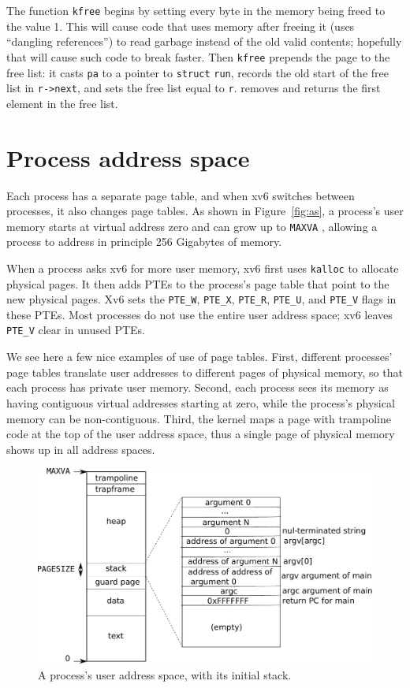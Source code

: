 The function
\lstinline{kfree}
begins by setting every byte in the
memory being freed to the value 1.
This will cause code that uses memory after freeing it
(uses ``dangling references'')
to read garbage instead of the old valid contents;
hopefully that will cause such code to break faster.
Then
\lstinline{kfree}
prepends the page to the free list:
it casts
\lstinline{pa}
to a pointer to
\lstinline{struct}
\lstinline{run},
records the old start of the free list in
\lstinline{r->next},
and sets the free list equal to
\lstinline{r}.
removes and returns the first element in the free list.

\section{Process address space}

Each process has a separate page table, and when xv6 switches between
processes, it also changes page tables.
As shown in
Figure~\ref{fig:as},
a process's user memory starts at virtual address
zero and can grow up to
\texttt{MAXVA}
,
allowing a process to address in principle 256 Gigabytes of memory.

When a process asks xv6 for more user memory,
xv6 first uses {\tt kalloc} to allocate physical pages.
It then adds PTEs to the process's page table that point
to the new physical pages.
Xv6 sets the
\lstinline{PTE_W},
\lstinline{PTE_X},
\lstinline{PTE_R},
\lstinline{PTE_U},
and
\lstinline{PTE_V}
flags in these PTEs.
Most processes do not use the entire user address space;
xv6 leaves
\lstinline{PTE_V}
clear in unused PTEs.

We see here a few nice examples of use of page tables.  First,
different processes' page tables translate user addresses to different
pages of physical memory, so that each process has private user
memory.  Second, each process sees its memory as having contiguous
virtual addresses starting at zero, while the process's physical
memory can be non-contiguous.  Third, the kernel maps a page with
trampoline code at the top of
the user address space, thus a single page of physical memory
shows up in all address spaces.

\begin{figure}[t]
\center
\includegraphics[scale=0.5]{fig/processlayout.pdf}
\caption{A process's user address space, with its initial stack.}
\label{fig:processlayout}
\end{figure}

